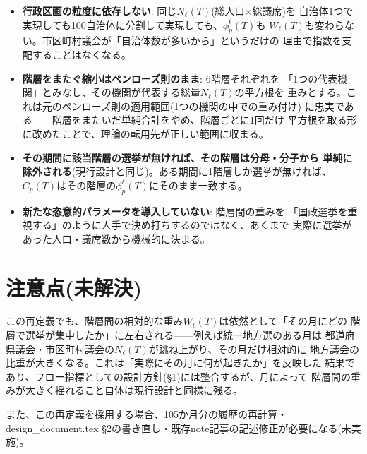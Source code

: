 \documentclass[a4paper,11pt]{ltjsarticle}
\begin{document}
\begin{itemize}
  \item \textbf{行政区画の粒度に依存しない}: 同じ$N_\ell(T)$(総人口×総議席)を
    自治体1つで実現しても100自治体に分割して実現しても、$\phi_p^\ell(T)$も
    $W_\ell(T)$も変わらない。市区町村議会が「自治体数が多いから」というだけの
    理由で指数を支配することはなくなる。
  \item \textbf{階層をまたぐ縮小はペンローズ則のまま}: 6階層それぞれを
    「1つの代表機関」とみなし、その機関が代表する総量$N_\ell(T)$の平方根を
    重みとする。これは元のペンローズ則の適用範囲(1つの機関の中での重み付け)
    に忠実である——階層をまたいだ単純合計をやめ、階層ごとに1回だけ
    平方根を取る形に改めたことで、理論の転用先が正しい範囲に収まる。
  \item \textbf{その期間に該当階層の選挙が無ければ、その階層は分母・分子から
    単純に除外される}(現行設計と同じ)。ある期間に1階層しか選挙が無ければ、
    $C_p(T)$はその階層の$\phi_p^\ell(T)$にそのまま一致する。
  \item \textbf{新たな恣意的パラメータを導入していない}: 階層間の重みを
    「国政選挙を重視する」のように人手で決め打ちするのではなく、あくまで
    実際に選挙があった人口・議席数から機械的に決まる。
\end{itemize}

\section{注意点(未解決)}

この再定義でも、階層間の相対的な重み$W_\ell(T)$は依然として「その月にどの
階層で選挙が集中したか」に左右される——例えば統一地方選のある月は
都道府県議会・市区町村議会の$N_\ell(T)$が跳ね上がり、その月だけ相対的に
地方議会の比重が大きくなる。これは「実際にその月に何が起きたか」を反映した
結果であり、フロー指標としての設計方針(\S1)には整合するが、月によって
階層間の重みが大きく揺れること自体は現行設計と同様に残る。

また、この再定義を採用する場合、105か月分の履歴の再計算・design\_document.tex
\S2の書き直し・既存note記事の記述修正が必要になる(未実施)。
\end{document}

